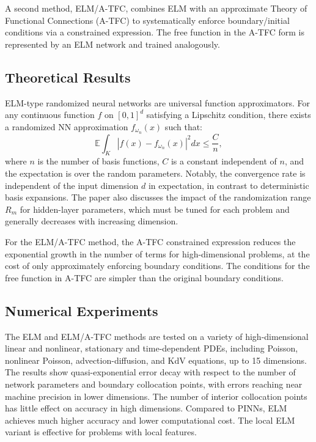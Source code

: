 \documentclass[12pt]{article}
\begin{document}
A second method, ELM/A-TFC, combines ELM with an approximate Theory of Functional Connections (A-TFC) to systematically enforce boundary/initial conditions via a constrained expression. The free function in the A-TFC form is represented by an ELM network and trained analogously.

\subsection{Theoretical Results}
ELM-type randomized neural networks are universal function approximators. For any continuous function $f$ on $[0,1]^d$ satisfying a Lipschitz condition, there exists a randomized NN approximation $f_{\omega_n}(x)$ such that:
\begin{equation}
    \mathbb{E} \int_K |f(x) - f_{\omega_n}(x)|^2 dx \leq \frac{C}{n},
\end{equation}
where $n$ is the number of basis functions, $C$ is a constant independent of $n$, and the expectation is over the random parameters. Notably, the convergence rate is independent of the input dimension $d$ in expectation, in contrast to deterministic basis expansions. The paper also discusses the impact of the randomization range $R_m$ for hidden-layer parameters, which must be tuned for each problem and generally decreases with increasing dimension.

For the ELM/A-TFC method, the A-TFC constrained expression reduces the exponential growth in the number of terms for high-dimensional problems, at the cost of only approximately enforcing boundary conditions. The conditions for the free function in A-TFC are simpler than the original boundary conditions.

\subsection{Numerical Experiments}
The ELM and ELM/A-TFC methods are tested on a variety of high-dimensional linear and nonlinear, stationary and time-dependent PDEs, including Poisson, nonlinear Poisson, advection-diffusion, and KdV equations, up to 15 dimensions. The results show quasi-exponential error decay with respect to the number of network parameters and boundary collocation points, with errors reaching near machine precision in lower dimensions. The number of interior collocation points has little effect on accuracy in high dimensions. Compared to PINNs, ELM achieves much higher accuracy and lower computational cost. The local ELM variant is effective for problems with local features.
\end{document}
